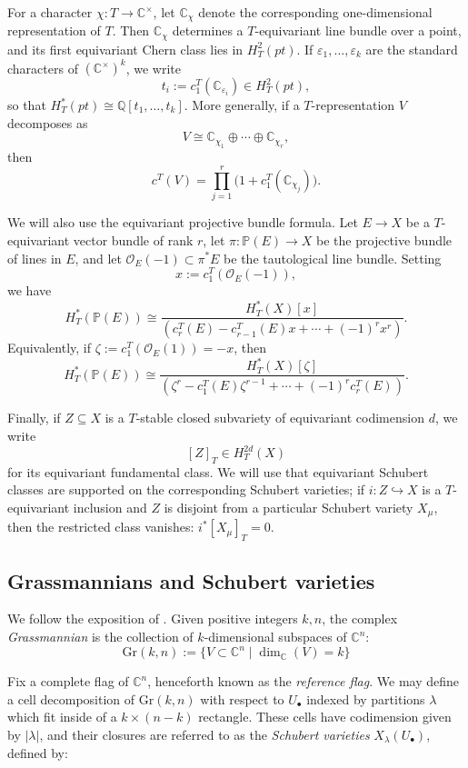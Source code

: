 \documentclass[11pt]{amsart}
\numberwithin{equation}{section}
\theoremstyle{definition}
\newcommand{\Gr}{{\mathrm {Gr}}}
\newcommand{\CC}{{\mathbb{C}}}
\newcommand{\QQ}{{\mathbb{Q}}}
\newcommand{\PP}{{\mathbb{P}}}
\begin{document}
For a character $\chi:T\to \CC^\times$, let $\CC_\chi$ denote the corresponding
one-dimensional representation of $T$. Then $\CC_\chi$ determines a
$T$-equivariant line bundle over a point, and its first equivariant Chern class
lies in $H_T^2(pt)$. If $\varepsilon_1,\dots,\varepsilon_k$ are the standard
characters of $(\CC^\times)^k$, we write
\[
    t_i:=c_1^T(\CC_{\varepsilon_i})\in H_T^2(pt),
\]
so that $H_T^*(pt)\cong \QQ[t_1,\dots,t_k]$. More generally, if a
$T$-representation $V$ decomposes as
\[
V\cong \CC_{\chi_1}\oplus \cdots \oplus \CC_{\chi_r},
\]
then
\[
    c^T(V)=\prod_{j=1}^r \bigl(1+c_1^T(\CC_{\chi_j})\bigr).
\]

We will also use the equivariant projective bundle formula. Let $E\to X$ be a
$T$-equivariant vector bundle of rank $r$, let $\pi:\PP(E)\to X$ be the
projective bundle of lines in $E$, and let $\mathcal O_E(-1)\subset \pi^*E$ be
the tautological line bundle. Setting
\[
x:=c_1^T(\mathcal O_E(-1)),
\]
we have
\[
H_T^*(\PP(E))
\cong
\frac{H_T^*(X)[x]}
{\left(c_r^T(E)-c_{r-1}^T(E)x+\cdots+(-1)^r x^r\right)}.
\]
Equivalently, if $\zeta:=c_1^T(\mathcal O_E(1))=-x$, then
\[
H_T^*(\PP(E))
\cong
\frac{H_T^*(X)[\zeta]}
{\left(\zeta^r-c_1^T(E)\zeta^{r-1}+\cdots+(-1)^r c_r^T(E)\right)}.
\]

Finally, if $Z\subseteq X$ is a $T$-stable closed subvariety of equivariant
codimension $d$, we write
\[
[Z]_T\in H_T^{2d}(X)
\]
for its equivariant fundamental class. We will use that equivariant Schubert classes are supported on the corresponding Schubert varieties; if $i: Z \hookrightarrow X$ is a $T$-equivariant inclusion and $Z$ is disjoint from a particular Schubert variety $X_\mu$, then the restricted class vanishes: $i^*[X_\mu]_T = 0$. 

\subsection{Grassmannians and Schubert varieties}

We follow the exposition of \cite{AH}. Given positive integers $k,n$, the complex \emph{Grassmannian} is the collection of $k$-dimensional subspaces of $\CC^n$:
\[
\Gr(k,n) := \{ V \subset \CC^n \mid \dim_\CC(V) = k \}
\]

Fix a complete flag of $\CC^n$, henceforth known as the \emph{reference flag}. We may define a cell decomposition of $\Gr(k,n)$ with respect to $U_\bullet$ indexed by partitions $\lambda$ which fit inside of a $k \times (n-k)$ rectangle. These cells have codimension given by $|\lambda|$, and their closures are referred to as the \emph{Schubert varieties} $X_\lambda(U_\bullet)$, defined by:
\end{document}
